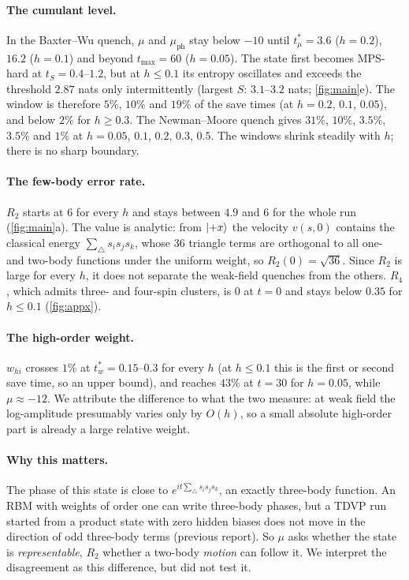 \documentclass[11pt,a4paper]{article}
\newcommand{\tmu}{t^*_\mu}
\newcommand{\tw}{t^*_w}
\newcommand{\whi}{w_{hi}}
\begin{document}
\paragraph{The cumulant level.} In the Baxter--Wu quench, $\mu$ and $\mu_{\mathrm{ph}}$ stay below $-10$ until
$\tmu=3.6$ ($h=0.2$), $16.2$ ($h=0.1$) and beyond $t_{\max}=60$ ($h=0.05$). The state first becomes MPS-hard at
$t_S=0.4$--$1.2$, but at $h\le0.1$ its entropy oscillates and exceeds the threshold $2.87$ nats only intermittently
(largest $S$: $3.1$--$3.2$ nats; \cref{fig:main}e). The window is therefore $5\%$, $10\%$ and $19\%$ of the save times
(at $h=0.2$, $0.1$, $0.05$), and below $2\%$ for $h\ge0.3$. The Newman--Moore quench gives $31\%$, $10\%$, $3.5\%$,
$3.5\%$ and $1\%$ at $h=0.05$, $0.1$, $0.2$, $0.3$, $0.5$. The windows shrink steadily with $h$; there is no sharp
boundary.

\paragraph{The few-body error rate.} $R_2$ starts at $6$ for every $h$ and stays between $4.9$ and $6$ for the whole
run (\cref{fig:main}a). The value is analytic: from $\ket{+x}$ the velocity $v(s,0)$ contains the classical energy
$\sum_\triangle s_is_js_k$, whose 36 triangle terms are orthogonal to all one- and two-body functions under the
uniform weight, so $R_2(0)=\sqrt{36}$. Since $R_2$ is large for every $h$, it does not separate the weak-field quenches
from the others. $R_4$, which admits three- and four-spin clusters, is $0$ at $t=0$ and stays below $0.35$ for
$h\le0.1$ (\cref{fig:appx}).

\paragraph{The high-order weight.} $\whi$ crosses $1\%$ at $\tw=0.15$--$0.3$ for every $h$ (at $h\le0.1$ this is
the first or second save time, so an upper bound), and reaches $43\%$ at $t=30$ for $h=0.05$, while $\mu\approx-12$.
We attribute the difference to what the two measure: at weak field the log-amplitude presumably varies only by
$O(h)$, so a small absolute high-order part is already a large relative weight.

\paragraph{Why this matters.} The phase of this state is close to $e^{it\sum_\triangle s_is_js_k}$, an exactly
three-body function. An RBM with weights of order one can write three-body phases, but a TDVP run started from a
product state with zero hidden biases does not move in the direction of odd three-body terms (previous report). So
$\mu$ asks whether the state is \emph{representable}, $R_2$ whether a two-body \emph{motion} can follow it. We interpret
the disagreement as this difference, but did not test it.
\end{document}
